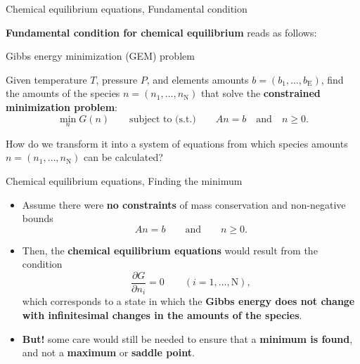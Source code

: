 %
\begin{frame}{Chemical equilibrium equations, Fundamental condition}

\alert{\textbf{Fundamental condition for chemical equilibrium}} reads as follows:
\vskip 5pt
%
\begin{cbox}{Gibbs energy minimization (GEM) problem}

Given temperature $T$, pressure $P$, and elements amounts ${b=(b_{1},\ldots,b_{\text{E}})}$,
find the amounts of the species ${n=(n_{1},\ldots,n_{\text{N}})}$
that solve the \textbf{constrained minimization problem}:
\[
\min_{n}G(n)\qquad\text{subject to (s.t.)}\qquad An=b\quad\text{and}\quad n\geq0.
\]

\end{cbox}
\vskip 5pt
How do we transform it into a system of equations from which species amounts $n=(n_{1},\ldots,n_{\text{N}})$ can be calculated?
\end{frame}
%
\begin{frame}{Chemical equilibrium equations, Finding the minimum}

\small
\begin{itemize}[<+->]
\item Assume there were \textbf{no constraints} of mass conservation and non-negative bounds
\[
An=b\qquad\text{and}\qquad n\geq0.
\]
%
\item Then, the \alert{\textbf{chemical equilibrium equations}} would result from
the condition
\[
\frac{\partial G}{\partial n_{i}}=0\qquad(i=1,\ldots,\text{N}),
\]
%
which corresponds to a state in which the {\bf Gibbs energy does not change with infinitesimal changes in the amounts of the species}. 
%
\item {\bf But!} some care would still be needed to ensure that a \textbf{minimum is found}, and not a \alert{\bf maximum} or \alert{\bf saddle point}.
\end{itemize}
\end{frame}
